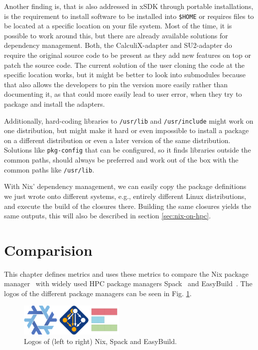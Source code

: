 \documentclass[conference,final,a4paper]{IEEEtran}
\begin{document}
Another finding is, that is also addressed in xSDK through portable installations, is the requirement to install software to be installed into \texttt{\$HOME} or requires files to be located at a specific location on your file system.
Most of the time, it is possible to work around this, but there are already available solutions for dependency management.
Both, the CalculiX-adapter and SU2-adapter do require the original source code to be present as they add new features on top or patch the source code.
The current solution of the user cloning the code at the specific location works, but it might be better to look into submodules because that also allows the developers to pin the version more easily rather than documenting it, as that could more easily lead to user error, when they try to package and install the adapters.

Additionally, hard-coding libraries to \texttt{/usr/lib} and \texttt{/usr/include} might work on one distribution, but might make it hard or even impossible to install a package on a different distribution or even a later version of the same distribution.
Solutions like \texttt{pkg-config} that can be configured, so it finds libraries outside the common paths, should always be preferred and work out of the box with the common paths like \texttt{/usr/lib}.

With Nix' dependency management, we can easily copy the package definitions we just wrote onto different systems, e.g., entirely different Linux distributions, and execute the build of the closures there.
Building the same closures yields the same outputs, this will also be described in section \ref{sec:nix-on-hpc}.

\section{Comparision}

This chapter defines metrics and uses these metrics to compare the Nix package manager~\cite{Dolstra_2004} with widely used HPC package managers Spack~\cite{Gamblin_2015} and EasyBuild~\cite{Geimer_2014}.
The logos of the different package managers can be seen in Fig. \ref{fig:pm-logos}.

\begin{figure}
    \centering
    \includegraphics[width=0.45\textwidth]{pm-logos.png}
    \caption{Logos of (left to right) Nix\cite{nix-logo}, Spack\cite{spack-logo} and EasyBuild\cite{easybuild-logo}.}
    \label{fig:pm-logos}
\end{figure}
\end{document}
